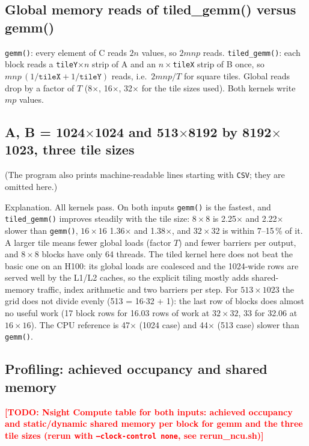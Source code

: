\documentclass[11pt,a4paper]{article}
\newcommand{\todo}[1]{\textcolor{red}{\textbf{[TODO: #1]}}}
\begin{document}
\subsection{Global memory reads of tiled\_gemm() versus gemm()}
\texttt{gemm()}: every element of C reads $2n$ values, so $2mnp$ reads. \texttt{tiled\_gemm()}: each block reads a
\texttt{tileY}$\times n$ strip of A and an $n\times$\texttt{tileX} strip of B once, so
$mnp\,(1/\texttt{tileX}+1/\texttt{tileY})$ reads, i.e.\ $2mnp/T$ for square tiles. Global reads drop by a factor of
$T$ (8$\times$, 16$\times$, 32$\times$ for the tile sizes used). Both kernels write $mp$ values.

\subsection{A, B = 1024$\times$1024 and 513$\times$8192 by 8192$\times$1023, three tile sizes}

(The program also prints machine-readable lines starting with \texttt{CSV}; they are omitted here.)

Explanation. All kernels pass. On both inputs \texttt{gemm()} is the fastest, and \texttt{tiled\_gemm()} improves
steadily with the tile size: $8\times8$ is 2.25$\times$ and 2.22$\times$ slower than \texttt{gemm()}, $16\times16$
1.36$\times$ and 1.38$\times$, and $32\times32$ is within 7--15\,\% of it. A larger tile means fewer global loads
(factor $T$) and fewer barriers per output, and $8\times8$ blocks have only 64 threads. The tiled kernel here does
not beat the basic one on an H100: its global loads are coalesced and the 1024-wide rows are served well by the
L1/L2 caches, so the explicit tiling mostly adds shared-memory traffic, index arithmetic and two barriers per step.
For $513\times1023$ the grid does not divide evenly (513 = 16$\cdot$32 + 1): the last row of blocks does almost
no useful work (17 block rows for 16.03 rows of work at $32\times32$, 33 for 32.06 at $16\times16$). The CPU reference is 47$\times$ (1024 case) and 44$\times$ (513 case) slower than
\texttt{gemm()}.

\subsection{Profiling: achieved occupancy and shared memory}
\todo{Nsight Compute table for both inputs: achieved occupancy and static/dynamic shared memory per block for gemm and the three tile sizes (rerun with \texttt{--clock-control none}, see rerun\_ncu.sh)}
\end{document}
